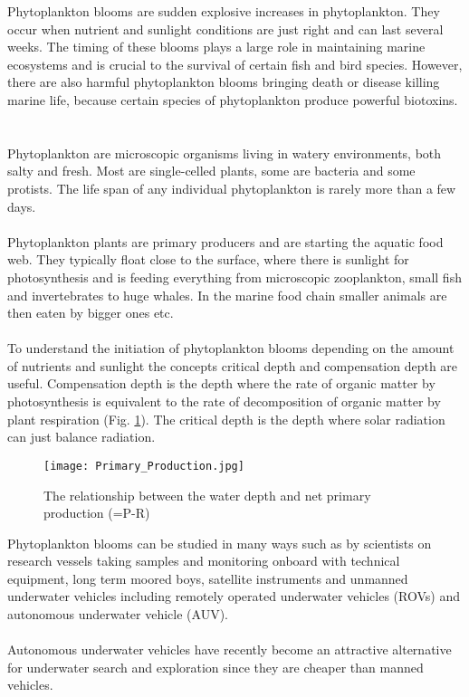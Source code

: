 \documentclass[../Main.tex]{subfiles}
\begin{document}
Phytoplankton blooms are sudden explosive increases in phytoplankton. 
They occur when nutrient and sunlight conditions are just right and can last several weeks. 
The timing of these blooms plays a large role in maintaining marine ecosystems and is crucial to the survival of certain fish and bird species. 
However, there are also harmful phytoplankton blooms bringing death or disease killing marine life, because certain species of phytoplankton produce powerful biotoxins.
\ \\ \ \\
Phytoplankton are microscopic organisms living in watery environments, both salty and fresh. 
Most are single-celled plants, some are bacteria and some protists. 
The life span of any individual phytoplankton is rarely more than a few days.
\ \\ \ \\
Phytoplankton plants are primary producers and are starting the aquatic food web.
They typically float close to the surface, where there is sunlight for photosynthesis and is feeding everything from microscopic zooplankton, small fish and invertebrates to huge whales. In the marine food chain smaller animals are then eaten by bigger ones etc. \supercite{Prim2021}
\ \\ \ \\
To understand the initiation of phytoplankton blooms depending on the amount of nutrients and sunlight the concepts critical depth and compensation depth are useful. 
Compensation depth is the depth where the rate of organic matter by photosynthesis is equivalent to the rate of decomposition of organic matter by plant respiration (Fig. \ref{fig:prim}).
The critical depth is the depth where solar radiation can just balance radiation.\supercite{Sverdrup1953OnCF}
\begin{figure}[H]
\texttt{[image: Primary\_Production.jpg]}
\caption{The relationship between the water depth and net primary production (=P-R) \supercite{Nasa2021}}
\label{fig:prim}
\end{figure}
Phytoplankton blooms can be studied in many ways such as by scientists on research vessels taking samples and monitoring onboard with technical equipment, long term moored boys, satellite instruments and unmanned underwater vehicles including remotely operated underwater vehicles (ROVs) and autonomous underwater vehicle (AUV). 
\ \\ \ \\
Autonomous underwater vehicles have recently become an attractive alternative for underwater search and exploration since they are cheaper than manned vehicles. 
\end{document}
